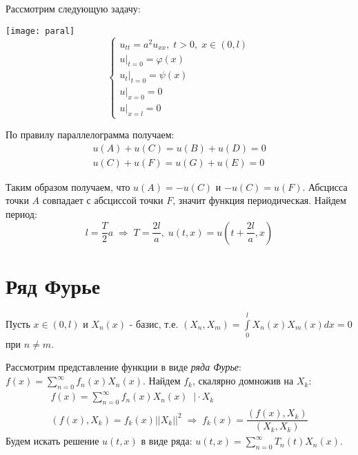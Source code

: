 Рассмотрим следующую задачу:
\begin{multicols}{2}
	\texttt{[image: paral]}
	\columnbreak
	$$\begin{cases}
		u_{tt} = a^2 u_{xx}, \; t > 0, \; x \in (0, l) \\
		u|_{t = 0} = \varphi (x) \\
		u_t |_{t = 0} = \psi (x) \\
		u|_{x = 0} = 0 \\
		u|_{x = l} = 0
	\end{cases}$$

	\hfill \break 
	По правилу параллелограмма получаем:
	$$\begin{gathered}
		u(A) + u(C) = u(B) + u(D) = 0 \\
		u(C) + u(F) = u(G) + u(E) = 0
	\end{gathered}$$
\end{multicols}

Таким образом получаем, что $u(A) = -u(C)$ и $-u(C) = u(F)$. Абсцисса точки $A$ совпадает с абсциссой точки $F$, значит функция периодическая. Найдем период:
$$l = \dfrac{T}{2}a \; \Rightarrow \;  T = \dfrac{2l}{a}, \; u(t, x) = u(t + \dfrac{2l}{a}, x)$$
\newpage

\section*{Ряд Фурье}

Пусть $x \in (0, l)$ и $X_n(x) $ - базис, т.е. $ (X_n, X_m ) = \int\limits_{0}^l X_n(x)X_m(x) dx = 0$ при $n \ne m $.

Рассмотрим представление функции в виде \textit{ряда Фурье}: $f(x) = \sum\limits_{n = 0}^\infty f_n(x)X_n(x)$.
Найдем $f_k$, скалярно домножив на $X_k$:
$$\begin{gathered}
	f(x) = \sum\limits_{n = 0}^\infty f_n(x)X_n(x) \; \; \Big| \cdot X_k \\
	(f(x), X_k) = f_k(x)||X_k||^2 \; \Rightarrow \; f_k(x) = \dfrac{(f(x), X_k)}{(X_k, X_k)}
\end{gathered}$$
Будем искать решение $ u(t, x) $ в виде ряда: $u(t, x) = \sum\limits_{n = 0}^\infty T_n(t)X_n(x)$.

